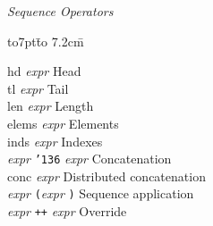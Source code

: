\documentclass[a4paper]{jsarticle}
\newcommand{\K}[1]{{\sf #1}}
\newcommand{\id}[1]{{\it #1\/}}
\newcommand{\lp}{{\tt(}}
\newcommand{\rp}{{\tt)}}
\newcommand{\TTtilde}{{\tt\char'136}}
\newenvironment{tabbingone}[0]{
\begingroup
  \parskip=0pt
  \topsep=0pt
  \partopsep=0pt
  \begin{tabbing}
    \hbox to7pt{}\=%
    \hbox to 7.2cm{}\=%
    \kill
    \+ %
    \kill
}{
  \end{tabbing}
\endgroup}
\begin{document}
\id{Sequence Operators}
\begin{tabbingone}
      \K{hd} \id{expr}\> Head       \\%
      \K{tl} \id{expr}\> Tail       \\%
      \K{len} \id{expr}\> Length     \\%
      \K{elems} \id{expr}\> Elements   \\%
      \K{inds} \id{expr}\> Indexes \\%
      \id{expr} \TTtilde{} \id{expr}\> Concatenation\\%
      \K{conc} \id{expr}\> Distributed concatenation\\%
      \id{expr} \lp \id{expr} \rp \> Sequence application \\ %
      \id{expr} {\tt++} \id{expr} \> Override \\

    \end{tabbingone}
    
\end{document}
